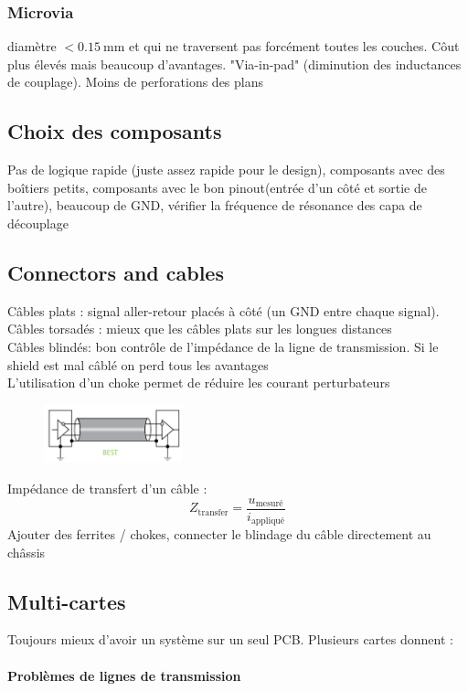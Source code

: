 \documentclass[resume]{subfiles}
\begin{document}
\begin{multicols}{3}
\subsubsection{Microvia}
diamètre $<\SI{0.15}{\milli\meter}$ et qui ne traversent pas forcément toutes les couches. Côut plus élevés mais beaucoup d'avantages. "Via-in-pad" (diminution des inductances de couplage). Moins de perforations des plans
\subsection{Choix des composants}
Pas de logique rapide (juste assez rapide pour le design), composants avec des boîtiers petits, composants avec le bon pinout(entrée d'un côté et sortie de l'autre), beaucoup de GND, vérifier la fréquence de résonance des capa de découplage

\subsection{Connectors and cables}
Câbles plats : signal aller-retour placés à côté (un GND entre chaque signal).\\
Câbles torsadés : mieux que les câbles plats sur les longues distances\\
Câbles blindés: bon contrôle de l'impédance de la ligne de transmission. Si le shield est mal câblé on perd tous les avantages\\
L'utilisation d'un choke permet de réduire les courant perturbateurs
\begin{figure}[H]
\centering
\includegraphics[width=4.00cm]{img_29.png}
\end{figure}
Impédance de transfert d'un câble :
$$Z_\text{transfer}=\frac{u_{\text{mesuré}}}{i_{\text{appliqué}}}$$
Ajouter des ferrites / chokes, connecter le blindage du câble directement au châssis
\subsection{Multi-cartes}
Toujours mieux d'avoir un système sur un seul PCB. Plusieurs cartes donnent :
\paragraph{Problèmes de lignes de transmission}

\end{multicols}
\end{document}
